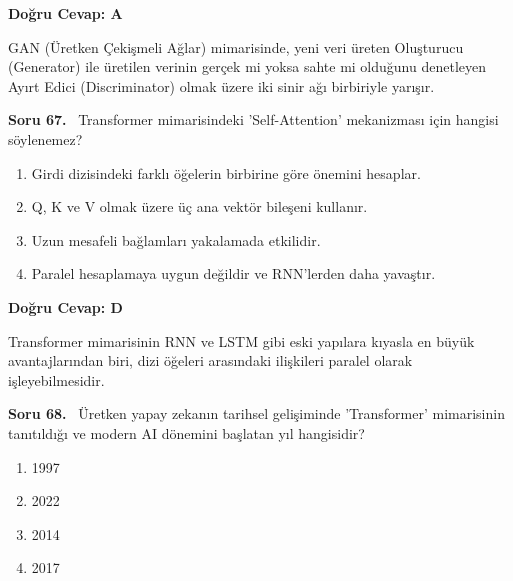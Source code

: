 \documentclass[11pt,a4paper,openany]{book}
\begin{document}
\vspace{4pt}
\begin{tcolorbox}[title=Cevap ve Açıklama, colback=gray!3!white, colframe=primarycolor!90!black, arc=2mm, fonttitle=\bfseries\sffamily, top=6pt, bottom=6pt]
    \textbf{Doğru Cevap: A}

    \vspace{2pt}
    GAN (Üretken Çekişmeli Ağlar) mimarisinde, yeni veri üreten Oluşturucu (Generator) ile üretilen verinin gerçek mi yoksa sahte mi olduğunu denetleyen Ayırt Edici (Discriminator) olmak üzere iki sinir ağı birbiriyle yarışır.
\end{tcolorbox}
\vspace{10pt}
\needspace{5cm}
\vspace{8pt}
\noindent\textbf{\large\sffamily Soru 67.} \ Transformer mimarisindeki 'Self-Attention' mekanizması için hangisi söylenemez?

\begin{enumerate}[label=\Alph*), leftmargin=25pt, topsep=4pt, itemsep=2pt]
        \item Girdi dizisindeki farklı öğelerin birbirine göre önemini hesaplar.
        \item Q, K ve V olmak üzere üç ana vektör bileşeni kullanır.
        \item Uzun mesafeli bağlamları yakalamada etkilidir.
        \item Paralel hesaplamaya uygun değildir ve RNN'lerden daha yavaştır.
\end{enumerate}

\vspace{4pt}
\begin{tcolorbox}[title=Cevap ve Açıklama, colback=gray!3!white, colframe=primarycolor!90!black, arc=2mm, fonttitle=\bfseries\sffamily, top=6pt, bottom=6pt]
    \textbf{Doğru Cevap: D}

    \vspace{2pt}
    Transformer mimarisinin RNN ve LSTM gibi eski yapılara kıyasla en büyük avantajlarından biri, dizi öğeleri arasındaki ilişkileri paralel olarak işleyebilmesidir.
\end{tcolorbox}
\vspace{10pt}
\needspace{5cm}
\vspace{8pt}
\noindent\textbf{\large\sffamily Soru 68.} \ Üretken yapay zekanın tarihsel gelişiminde 'Transformer' mimarisinin tanıtıldığı ve modern AI dönemini başlatan yıl hangisidir?

\begin{enumerate}[label=\Alph*), leftmargin=25pt, topsep=4pt, itemsep=2pt]
        \item 1997
        \item 2022
        \item 2014
        \item 2017
\end{enumerate}
\end{document}
